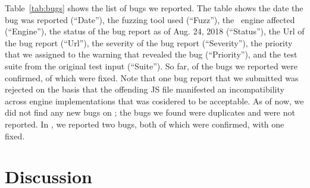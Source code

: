 \documentclass[10pt,conference,anonymous]{IEEEtran}
\begin{document}
Table~\ref{tab:bugs} shows the list of bugs we reported. The table
shows the date the bug was reported (``Date''), the fuzzing tool used
(``Fuzz''), the \js\ engine affected (``Engine''), the status of the
bug report as of Aug. 24, 2018 (``Status''), the Url of the bug report
(``Url''), the severity of the bug report (``Severity''), the priority
that we assigned to the warning that revealed the bug (``Priority''),
and the test suite from the original test input (``Suite''). So far,
 of the bugs we reported were confirmed,  of which
were fixed. Note that one bug report that we submitted was rejected on
the basis that the offending JS file manifested an incompatibility
across engine implementations that was cosidered to be acceptable. As
of now, we did not find any new bugs on \smonkey{}; the bugs we found
were duplicates and were not reported. In \veight{}, we reported two
bugs, both of which were confirmed, with one fixed.





\begin{center}
\end{center}


\section{Discussion}
\label{sec:bugs}
\end{document}
